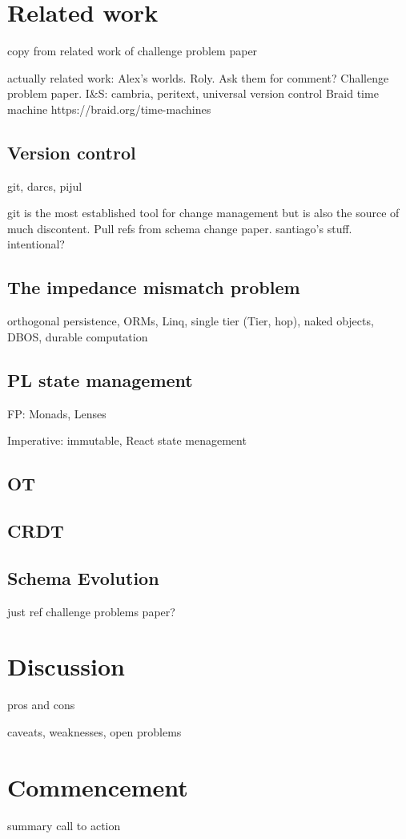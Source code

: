 \documentclass[english,submission]{programming}
\theoremstyle{definition}
\begin{document}
\section{Related work}

copy from related work of challenge problem paper

actually related work:
Alex's worlds. Roly. Ask them for comment?
Challenge problem paper.
I\&S: cambria, peritext, universal version control
Braid time machine https://braid.org/time-machines

\subsection{Version control}\label{VC}

git, darcs, pijul

git is the most established tool for change management but is also the source of much discontent. Pull refs from schema change paper. santiago's stuff. intentional?

\subsection{The impedance mismatch problem} \label{impedance}

orthogonal persistence, ORMs, Linq, single tier (Tier, hop), naked objects, DBOS, durable computation

\subsection{PL state management}\label{PLstate}

FP: Monads, Lenses

Imperative: immutable, React state menagement

\subsection{OT}\label{OT}

\subsection{CRDT}\label{CRDT}

\subsection{Schema Evolution}\label{schema}
just ref challenge problems paper?








\section{Discussion}
pros and cons

caveats, weaknesses, open problems

\section{Commencement}
summary
call to action

\printbibliography
\end{document}
